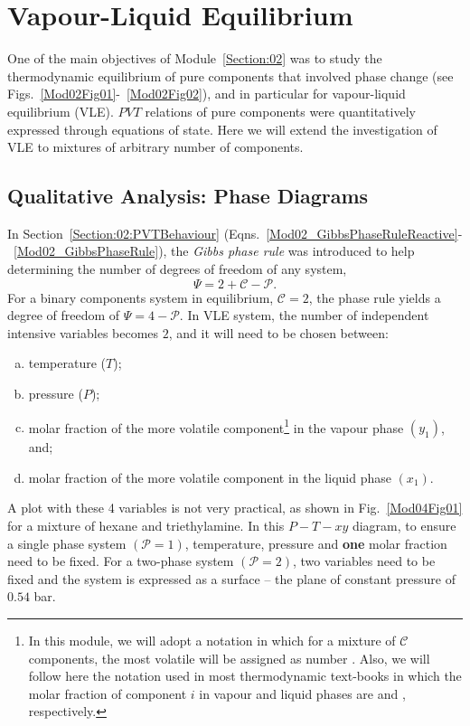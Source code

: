 \section{Vapour-Liquid Equilibrium}\label{Chapter:VLE:VLE}

One of the main objectives of Module~\ref{Section:02} was to study the thermodynamic equilibrium of pure components that involved phase change (see Figs.~\ref{Mod02Fig01}-~\ref{Mod02Fig02}), and in particular for vapour-liquid equilibrium (VLE). $PVT$ relations of pure components were quantitatively expressed through equations of state. Here we will extend the investigation of VLE to mixtures of arbitrary number of components.

\subsection{Qualitative Analysis: Phase Diagrams}\label{Chapter:VLE:PhaseDiagrams}
In Section~\ref{Section:02:PVTBehaviour} (Eqns.~\ref{Mod02_GibbsPhaseRuleReactive}-~\ref{Mod02_GibbsPhaseRule}), the {\it Gibbs phase rule} was introduced to help determining the number of degrees of freedom of any system,
    \begin{displaymath}
        \Psi = 2 + \mathcal{C} - \mathcal{P}.
    \end{displaymath}
For a binary components system in equilibrium, $\mathcal{C}=2$, the phase rule yields a degree of freedom of $\Psi=4-\mathcal{P}$. In VLE system, the number of independent intensive variables becomes $2$, and it will need to be chosen between:
\begin{enumerate}[a)]
   \item temperature ($T$);
   \item pressure ($P$);
   \item molar fraction of the more volatile component\footnote{In this module, we will adopt a notation in which for a mixture of $\mathcal{C}$ components, the most volatile will be assigned as number . Also, we will follow here the notation used in most thermodynamic text-books in which the molar fraction of component $i$ in vapour and liquid phases are  and , respectively.} in the vapour phase $\left(y_{1}\right)$, and;
   \item molar fraction of the more volatile component in the liquid phase $\left(x_{1}\right)$.
\end{enumerate}
A plot with these 4 variables is not very practical, as shown in Fig.~\ref{Mod04Fig01} for a mixture of hexane and triethylamine. In this $P-T-xy$ diagram, to ensure a single phase system $\left(\mathcal{P}=1\right)$, temperature, pressure and {\bf one} molar fraction need to be fixed. For a two-phase system $\left(\mathcal{P}=2\right)$, two variables need to be fixed and the system is expressed as a surface -- \eg the plane of constant pressure of $0.54$ bar. %
